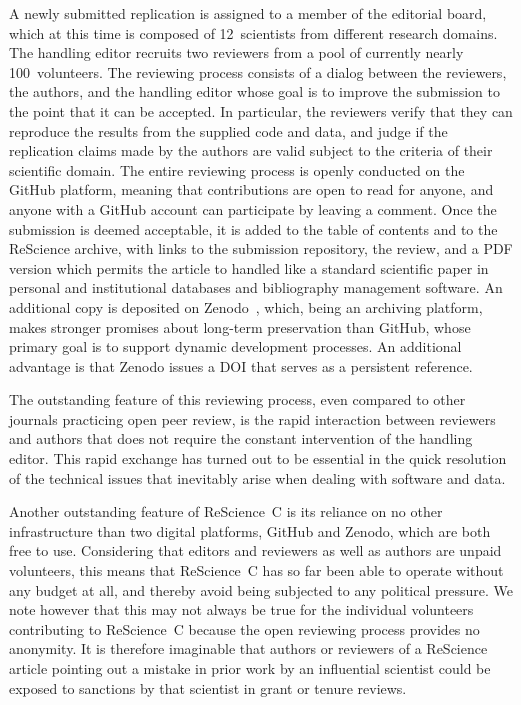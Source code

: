 \documentclass[runningheads]{llncs}
\begin{document}
A newly submitted replication is assigned to a member of the editorial board, which at this time is composed of 12~scientists from different research domains. The handling editor recruits two reviewers from a pool of currently nearly 100~volunteers. The reviewing process consists of a dialog between the reviewers, the authors, and the handling editor whose goal is to improve the submission to the point that it can be accepted. In particular, the reviewers verify that they can reproduce the results from the supplied code and data, and judge if the replication claims made by the authors are valid subject to the criteria of their scientific domain. The entire reviewing process is openly conducted on the GitHub platform, meaning that contributions are open to read for anyone, and anyone with a GitHub account can participate by leaving a comment. Once the submission is deemed acceptable, it is added to the table of contents and to the ReScience archive, with links to the submission repository, the review, and a PDF version which permits the article to handled like a standard scientific paper in personal and institutional databases and bibliography management software. An additional copy is deposited on Zenodo~\cite{Zenodo}, which, being an archiving platform, makes stronger promises about long-term preservation than GitHub, whose primary goal is to support dynamic development processes. An additional advantage is that Zenodo issues a DOI that serves as a persistent reference.

The outstanding feature of this reviewing process, even compared to other journals practicing open peer review, is the rapid interaction between reviewers and authors that does not require the constant intervention of the handling editor. This rapid exchange has turned out to be essential in the quick resolution of the technical issues that inevitably arise when dealing with software and data.

Another outstanding feature of ReScience~C is its reliance on no other infrastructure than two digital platforms, GitHub and Zenodo, which are both free to use. Considering that editors and reviewers as well as authors are unpaid volunteers, this means that ReScience~C has so far been able to operate without any budget at all, and thereby avoid being subjected to any political pressure. We note however that this may not always be true for the individual volunteers contributing to ReScience~C because the open reviewing process provides no anonymity. It is therefore imaginable that authors or reviewers of a ReScience article pointing out a mistake in prior work by an influential scientist could be exposed to sanctions by that scientist in grant or tenure reviews.
\end{document}

